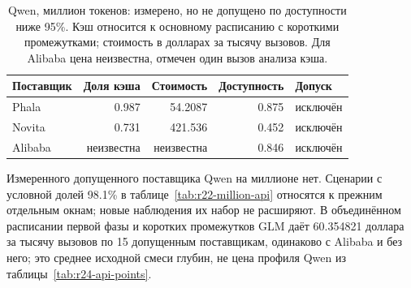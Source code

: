 \begin{table}[t]
\centering
\caption{Qwen, миллион токенов: измерено, но не допущено по доступности ниже 95\%.
Кэш относится к основному расписанию с короткими промежутками; стоимость в долларах за тысячу вызовов.
Для Alibaba цена неизвестна, отмечен один вызов анализа кэша.}
\label{tab:qwen-million-measured-excluded}
\footnotesize
\begin{tabular}{lrrrl}
\toprule
Поставщик & Доля кэша & Стоимость & Доступность & Допуск \\
\midrule
Phala & 0.987 & 54.2087 & 0.875 & исключён \\
Novita & 0.731 & 421.536 & 0.452 & исключён \\
Alibaba & неизвестна & неизвестна & 0.846 & исключён \\
\bottomrule
\end{tabular}
\end{table}

Измеренного допущенного поставщика Qwen на миллионе нет.
Сценарии с условной долей 98.1\% в таблице~\ref{tab:r22-million-api} относятся к прежним отдельным окнам;
новые наблюдения их набор не расширяют. В объединённом расписании первой фазы и коротких промежутков GLM даёт 60.354821 доллара за тысячу вызовов
по 15 допущенным поставщикам, одинаково с Alibaba и без него; это среднее исходной смеси глубин,
не цена профиля Qwen из таблицы~\ref{tab:r24-api-points}.

